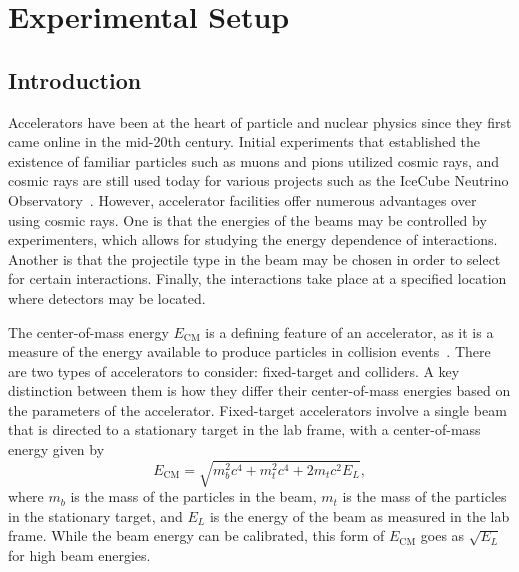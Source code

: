 
\chapter{Experimental Setup}
\label{chap:exp}

\section{Introduction}

Accelerators have been at the heart of particle and nuclear physics since they first came online in the mid-20th century.
Initial experiments that established the existence of familiar particles such as muons and pions utilized cosmic rays, and cosmic rays are still used today for various projects such as the IceCube Neutrino Observatory~\cite{Abbasi_2009}.
However, accelerator facilities offer numerous advantages over using cosmic rays.
One is that the energies of the beams may be controlled by experimenters, which allows for studying the energy dependence of interactions.
Another is that the projectile type in the beam may be chosen in order to select for certain interactions.
Finally, the interactions take place at a specified location where detectors may be located.

The center-of-mass energy $E_\mathrm{CM}$\footnotemark{} is a defining feature of an accelerator, as it is a measure of the energy available to produce particles in collision events~\cite{martin2008particle}.
There are two types of accelerators to consider: fixed-target and colliders. %
A key distinction between them is how they differ their center-of-mass energies based on the parameters of the accelerator.
Fixed-target accelerators involve a single beam that is directed to a stationary target in the lab frame, with a center-of-mass energy given by
\begin{equation}
  E_\mathrm{CM}=\sqrt{m_b^2c^4+m_t^2c^4+2m_tc^2E_L},
\end{equation}
where $m_b$ is the mass of the particles in the beam, $m_t$ is the mass of the particles in the stationary target, and $E_L$ is the energy of the beam as measured in the lab frame.
While the beam energy can be calibrated, this form of $E_\mathrm{CM}$ goes as $\sqrt{E_L}$ for high beam energies.

